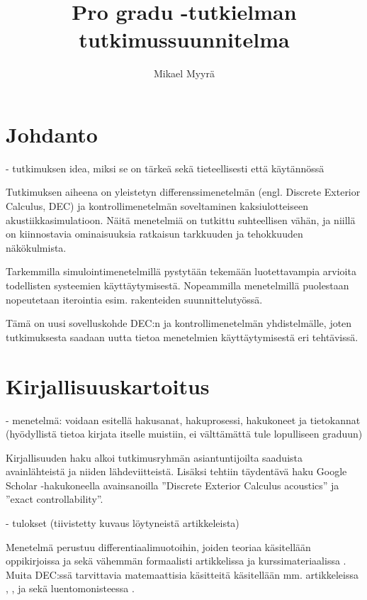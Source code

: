 \documentclass[utf8]{gradu3}
\title{Pro gradu -tutkielman tutkimussuunnitelma}
\author{Mikael Myyrä}
\begin{document}
\maketitle
\mainmatter
\sloppypar

\chapter{Johdanto}

- tutkimuksen idea, miksi se on tärkeä sekä tieteellisesti että käytännössä

Tutkimuksen aiheena on yleistetyn differenssimenetelmän
(engl. Discrete Exterior Calculus, DEC) ja kontrollimenetelmän
soveltaminen kaksiulotteiseen akustiikkasimulatioon.
Näitä menetelmiä on tutkittu suhteellisen vähän,
ja niillä on kiinnostavia ominaisuuksia
ratkaisun tarkkuuden ja tehokkuuden näkökulmista.

Tarkemmilla simulointimenetelmillä pystytään tekemään luotettavampia arvioita
todellisten systeemien käyttäytymisestä.
Nopeammilla menetelmillä puolestaan nopeutetaan iterointia
esim. rakenteiden suunnittelutyössä.

Tämä on uusi sovelluskohde DEC:n ja kontrollimenetelmän yhdistelmälle,
joten tutkimuksesta saadaan uutta tietoa menetelmien käyttäytymisestä eri tehtävissä.

\chapter{Kirjallisuuskartoitus}

- menetelmä: voidaan esitellä hakusanat, hakuprosessi, hakukoneet ja tietokannat (hyödyllistä tietoa kirjata itselle muistiin, ei välttämättä tule lopulliseen graduun)

Kirjallisuuden haku alkoi tutkimusryhmän asiantuntijoilta saaduista avainlähteistä
ja niiden lähdeviitteistä.
Lisäksi tehtiin täydentävä haku Google Scholar -hakukoneella
avainsanoilla ''Discrete Exterior Calculus acoustics'' ja ''exact controllability''.

- tulokset (tiivistetty kuvaus löytyneistä artikkeleista)

Menetelmä perustuu differentiaalimuotoihin, joiden teoriaa käsitellään
oppikirjoissa \parencite{abraham_manifolds_2012} ja \parencite{lee_introduction_2012}
sekä vähemmän formaalisti artikkelissa \parencite{blair_perot_differential_2014}
ja kurssimateriaalissa \parencite{crane_digital_2013}.
Muita DEC:ssä tarvittavia matemaattisia käsitteitä
käsitellään mm. artikkeleissa \parencite{lohi_whitney_2021},
\parencite{engquist_absorbing_1977}, \parencite{mur_finite-element_1993}
ja \parencite{plessix_review_2006} sekä luentomonisteessa \parencite{gillette_notes_2009}.
\end{document}
